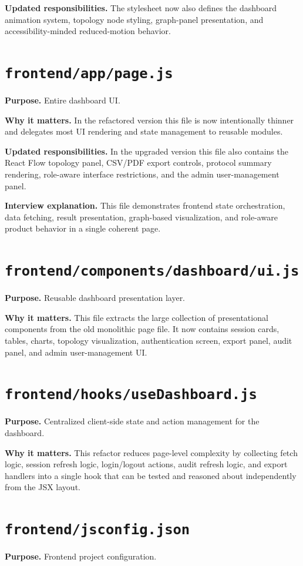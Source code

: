 \documentclass[12pt,a4paper]{report}
\begin{document}
\textbf{Updated responsibilities.} The stylesheet now also defines the dashboard animation system, topology node styling, graph-panel presentation, and accessibility-minded reduced-motion behavior.

\section{\texttt{frontend/app/page.js}}
\textbf{Purpose.} Entire dashboard UI.

\textbf{Why it matters.} In the refactored version this file is now intentionally thinner and delegates most UI rendering and state management to reusable modules.

\textbf{Updated responsibilities.} In the upgraded version this file also contains the React Flow topology panel, CSV/PDF export controls, protocol summary rendering, role-aware interface restrictions, and the admin user-management panel.

\textbf{Interview explanation.} This file demonstrates frontend state orchestration, data fetching, result presentation, graph-based visualization, and role-aware product behavior in a single coherent page.

\section{\texttt{frontend/components/dashboard/ui.js}}
\textbf{Purpose.} Reusable dashboard presentation layer.

\textbf{Why it matters.} This file extracts the large collection of presentational components from the old monolithic page file. It now contains session cards, tables, charts, topology visualization, authentication screen, export panel, audit panel, and admin user-management UI.

\section{\texttt{frontend/hooks/useDashboard.js}}
\textbf{Purpose.} Centralized client-side state and action management for the dashboard.

\textbf{Why it matters.} This refactor reduces page-level complexity by collecting fetch logic, session refresh logic, login/logout actions, audit refresh logic, and export handlers into a single hook that can be tested and reasoned about independently from the JSX layout.

\section{\texttt{frontend/jsconfig.json}}
\textbf{Purpose.} Frontend project configuration.
\end{document}
